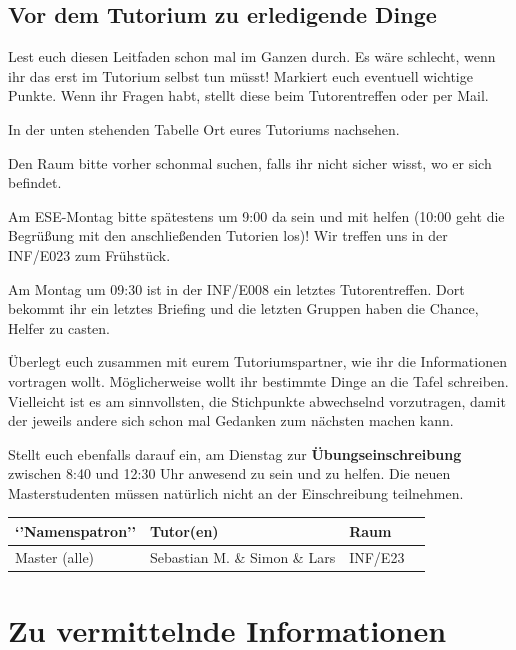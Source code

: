 \documentclass[a4paper,12pt]{report}
\begin{document}
\section{Vor dem Tutorium zu erledigende Dinge}
\begin{itemize*}
\item Lest euch diesen Leitfaden schon mal im Ganzen durch.
Es wäre schlecht, wenn ihr das erst im Tutorium selbst tun müsst!
Markiert euch eventuell wichtige Punkte.
Wenn ihr Fragen habt, stellt diese beim Tutorentreffen oder per Mail.
\item In der unten stehenden Tabelle Ort eures Tutoriums nachsehen.
\item Den Raum bitte vorher schonmal suchen, falls ihr nicht sicher wisst, wo er sich befindet.
\item Am ESE-Montag bitte spätestens um 9:00 da sein und mit helfen (10:00 geht die Begrüßung mit den anschließenden Tutorien los)!
Wir treffen uns in der INF/E023 zum Frühstück.
\item Am Montag um 09:30 ist in der INF/E008 ein letztes Tutorentreffen.
Dort bekommt ihr ein letztes Briefing  und die letzten Gruppen haben die Chance, Helfer zu casten.
\item Überlegt euch zusammen mit eurem Tutoriumspartner, wie ihr die Informationen vortragen wollt.
Möglicherweise wollt ihr bestimmte Dinge an die Tafel schreiben.
Vielleicht ist es am sinnvollsten, die Stichpunkte abwechselnd vorzutragen, damit der jeweils andere sich schon mal Gedanken zum nächsten machen kann.
\item Stellt euch ebenfalls darauf ein, am Dienstag zur \textbf{Übungseinschreibung} zwischen 8:40 und 12:30 Uhr anwesend zu sein und zu helfen. Die neuen Masterstudenten müssen natürlich nicht an der Einschreibung teilnehmen.
\end{itemize*}

\begin{center}
\vspace{1cm}
\begin{tabular}[h]{|l|l|l|l|}
	\hline
	\textbf{`'Namenspatron''} & \textbf{Tutor(en)} & \textbf{Raum}\\ \hline
	Master (alle) & Sebastian M. \&  Simon  \& Lars & INF/E23\\
	\hline
\end{tabular}
\end{center}

\chapter{Zu vermittelnde Informationen}
\end{document}
